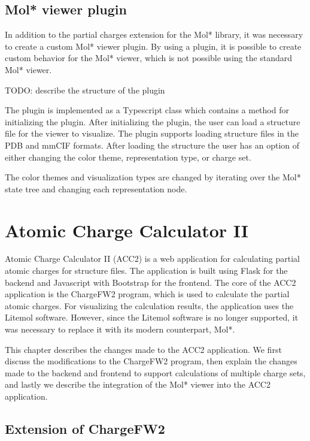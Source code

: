 \documentclass[
  digital,     %
  oneside,     %
  nosansbold,  %
  nocolorbold, %
  lof,         %
  lot,         %
]{fithesis4}
\begin{document}
\section{Mol* viewer plugin}
\label{chapter:molstar_viewer_plugin}

In addition to the partial charges extension for the Mol* library, it was necessary to create a custom Mol* viewer plugin. By using a plugin, it is possible to create custom behavior for the Mol* viewer, which is not possible using the standard Mol* viewer.

TODO: describe the structure of the plugin

The plugin is implemented as a Typescript class which contains a method for initializing the plugin. After initializing the plugin, the user can load a structure file for the viewer to visualize. The plugin supports loading structure files in the PDB and mmCIF formats. After loading the structure the user has an option of either changing the color theme, representation type, or charge set.

The color themes and visualization types are changed by iterating over the Mol* state tree and changing each representation node.

\chapter{Atomic Charge Calculator II}
\label{chapter:atomic_charge_calculator_ii}

Atomic Charge Calculator II (ACC2) is a web application for calculating partial atomic charges for structure files. The application is built using Flask for the backend and Javascript with Bootstrap for the frontend. The core of the ACC2 application is the ChargeFW2 program, which is used to calculate the partial atomic charges. For visualizing the calculation results, the application uses the Litemol software. \cite{racek2020acc2} However, since the Litemol software is no longer supported, it was necessary to replace it with its modern counterpart, Mol*.

This chapter describes the changes made to the ACC2 application. We first discuss the modifications to the ChargeFW2 program, then explain the changes made to the backend and frontend to support calculations of multiple charge sets, and lastly we describe the integration of the Mol* viewer into the ACC2 application.

\section{Extension of ChargeFW2}
\label{section:chargefw2_extension}
\end{document}
